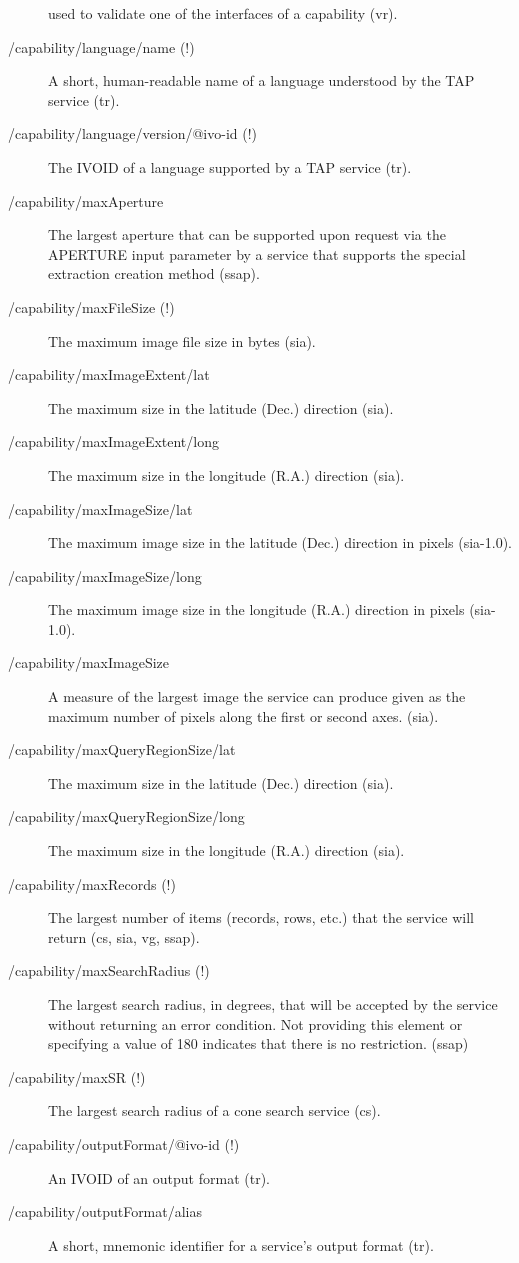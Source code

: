 \documentclass[11pt,a4paper]{ivoa}
\begin{document}
\begin{description}
used to validate one of the interfaces of a capability (vr).
\item[/capability/language/name (!)]A short, human-readable name of a language understood by the TAP service (tr).
\item[/capability/language/version/@ivo-id (!)]The IVOID of a language supported by a TAP service (tr).
\item[/capability/maxAperture]The largest aperture that can be supported upon request via the APERTURE input parameter by a service that supports the special extraction creation method (ssap).
\item[/capability/maxFileSize (!)]The maximum image file size in bytes (sia).
\item[/capability/maxImageExtent/lat]The maximum size in the latitude (Dec.) direction (sia).
\item[/capability/maxImageExtent/long]The maximum size in the longitude (R.A.) direction (sia).
\item[/capability/maxImageSize/lat]The maximum image size in the latitude (Dec.) direction in pixels (sia-1.0).
\item[/capability/maxImageSize/long]The maximum image size in the longitude (R.A.) direction in pixels (sia-1.0).
\item[/capability/maxImageSize]A measure of the largest image the service can produce given as the maximum number of pixels along the first or second axes. (sia).
\item[/capability/maxQueryRegionSize/lat]The maximum size in the latitude (Dec.) direction (sia).
\item[/capability/maxQueryRegionSize/long]The maximum size in the longitude (R.A.) direction (sia).
\item[/capability/maxRecords (!)]The largest number of items (records, rows, etc.) that the service will return (cs, sia, vg, ssap).
\item[/capability/maxSearchRadius (!)]The largest search radius, in degrees, that will be accepted by the service without returning an error condition. Not providing this element or specifying a value of 180 indicates that there is no restriction. (ssap)
\item[/capability/maxSR (!)]The largest search radius of a cone search service (cs).
\item[/capability/outputFormat/@ivo-id (!)]An IVOID of an output format (tr).
\item[/capability/outputFormat/alias]A short, mnemonic identifier for a service's output format (tr).

\end{description}
\end{document}
